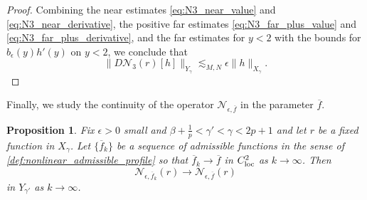 \documentclass[11pt]{amsart}
\newtheorem{proposition}[theorem]{Proposition}
\theoremstyle{definition}
\theoremstyle{remark}
\numberwithin{equation}{section}
\newcommand{\mc}[1]{\mathcal{#1}}
\newcommand{\ov}[1]{\overline{#1}}
\begin{document}
\begin{proof}
Combining the near estimates \eqref{eq:N3_near_value} and \eqref{eq:N3_near_derivative}, the positive far estimates \eqref{eq:N3_far_plus_value} and \eqref{eq:N3_far_plus_derivative}, and the far estimates for $y<2$ with the bounds for
$b_\epsilon(y)h'(y)$ on $y<2$, we conclude that
\[
    \|D\mc{N}_3(r)[h]\|_{Y_\gamma}
    \lesssim_{M,N}\epsilon\|h\|_{X_\gamma}.
\]
\end{proof}

Finally, we study the continuity of the operator $\mc{N}_{\epsilon, \ov{f}}$ in the parameter $\ov{f}$. 

\begin{proposition}\label{prop:nonlinear_continuity}
    Fix $\epsilon > 0$ small and $\beta + \frac{1}{p} < \gamma' < \gamma < 2p + 1$ and let $r$ be a fixed function in $X_{\gamma}$. Let $\{\ov{f}_k\}$ be a sequence of admissible functions in the sense of \cref{def:nonlinear_admissible_profile} so that $\ov{f}_k \to \ov{f}$ in $C^2_{\textup{loc}}$ as $k \to \infty$. Then 
    \[\mc{N}_{\epsilon, \ov{f}_k}(r) \to \mc{N}_{\epsilon, \ov{f}}(r)\]
    in $Y_{\gamma'}$ as $k \to \infty$.
\end{proposition}
\end{document}
